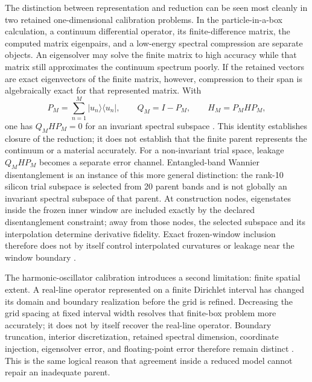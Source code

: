 \documentclass[11pt]{article}
\theoremstyle{definition}
\begin{document}
The distinction between representation and reduction can be seen most cleanly in two
retained one-dimensional calibration problems.  In the particle-in-a-box calculation,
a continuum differential operator, its finite-difference matrix, the computed matrix
eigenpairs, and a low-energy spectral compression are separate objects.  An eigensolver
may solve the finite matrix to high accuracy while that matrix still approximates the
continuum spectrum poorly.  If the retained vectors are exact eigenvectors of the finite
matrix, however, compression to their span is algebraically exact for that represented
matrix.  With
\begin{equation}
 P_M=\sum_{n=1}^{M}\lvert u_n\rangle\langle u_n\rvert,
 \qquad Q_M=I-P_M,
 \qquad H_M=P_MHP_M,
 \label{eq:spectral-reduction-projectors}
\end{equation}
one has $Q_MHP_M=0$ for an invariant spectral subspace
\cite{shankar1994,teschl2014,hornJohnson2013}.  This identity establishes closure of the
reduction; it does not establish that the finite parent represents the continuum or a
material accurately.  For a non-invariant trial space, leakage $Q_MHP_M$ becomes a
separate error channel.  Entangled-band Wannier disentanglement is an instance of this
more general distinction: the rank-10 silicon trial subspace is selected from 20 parent
bands and is not globally an invariant spectral subspace of that parent.  At construction
nodes, eigenstates inside the frozen inner window are included exactly by the declared
disentanglement constraint; away from those nodes, the selected subspace and its
interpolation determine derivative fidelity.  Exact frozen-window inclusion therefore
does not by itself control interpolated curvatures or leakage near the window boundary
\cite{souza2001,marzari2012,qiao2023}.

The harmonic-oscillator calibration introduces a second limitation: finite spatial
extent.  A real-line operator represented on a finite Dirichlet interval has changed its
domain and boundary realization before the grid is refined.  Decreasing the grid spacing
at fixed interval width resolves that finite-box problem more accurately; it does not by
itself recover the real-line operator.  Boundary truncation, interior discretization,
retained spectral dimension, coordinate injection, eigensolver error, and floating-point
error therefore remain distinct \cite{strikwerda2004}.  This is the same logical reason
that agreement inside a reduced model cannot repair an inadequate parent.
\end{document}
